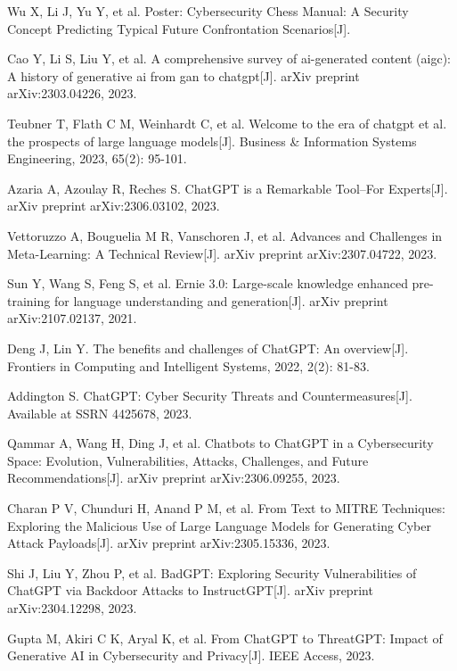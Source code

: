 \documentclass[runningheads]{llncs}
\begin{document}
\begin{thebibliography}{8}
Wu X, Li J, Yu Y, et al. Poster: Cybersecurity Chess Manual: A Security Concept Predicting Typical Future Confrontation Scenarios[J].

Cao Y, Li S, Liu Y, et al. A comprehensive survey of ai-generated content (aigc): A history of generative ai from gan to chatgpt[J]. arXiv preprint arXiv:2303.04226, 2023.

Teubner T, Flath C M, Weinhardt C, et al. Welcome to the era of chatgpt et al. the prospects of large language models[J]. Business \& Information Systems Engineering, 2023, 65(2): 95-101.

Azaria A, Azoulay R, Reches S. ChatGPT is a Remarkable Tool--For Experts[J]. arXiv preprint arXiv:2306.03102, 2023.

Vettoruzzo A, Bouguelia M R, Vanschoren J, et al. Advances and Challenges in Meta-Learning: A Technical Review[J]. arXiv preprint arXiv:2307.04722, 2023.

Sun Y, Wang S, Feng S, et al. Ernie 3.0: Large-scale knowledge enhanced pre-training for language understanding and generation[J]. arXiv preprint arXiv:2107.02137, 2021.

Deng J, Lin Y. The benefits and challenges of ChatGPT: An overview[J]. Frontiers in Computing and Intelligent Systems, 2022, 2(2): 81-83.

Addington S. ChatGPT: Cyber Security Threats and Countermeasures[J]. Available at SSRN 4425678, 2023.

Qammar A, Wang H, Ding J, et al. Chatbots to ChatGPT in a Cybersecurity Space: Evolution, Vulnerabilities, Attacks, Challenges, and Future Recommendations[J]. arXiv preprint arXiv:2306.09255, 2023.

Charan P V, Chunduri H, Anand P M, et al. From Text to MITRE Techniques: Exploring the Malicious Use of Large Language Models for Generating Cyber Attack Payloads[J]. arXiv preprint arXiv:2305.15336, 2023.

Shi J, Liu Y, Zhou P, et al. BadGPT: Exploring Security Vulnerabilities of ChatGPT via Backdoor Attacks to InstructGPT[J]. arXiv preprint arXiv:2304.12298, 2023.

Gupta M, Akiri C K, Aryal K, et al. From ChatGPT to ThreatGPT: Impact of Generative AI in Cybersecurity and Privacy[J]. IEEE Access, 2023.


\end{thebibliography}
\end{document}
